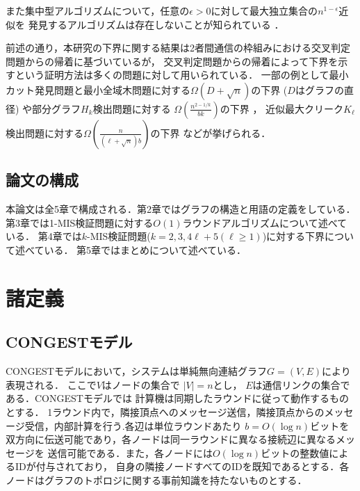 \documentclass[12pt]{thesis}
\newcommand{\CONGEST}{\textsf{CONGEST}}
\theoremstyle{definition}
\begin{document}
また集中型アルゴリズムについて，任意の$\epsilon > 0$に対して最大独立集合の$n^{1 - \epsilon}$近似を
発見するアルゴリズムは存在しないことが知られている \cite{haastad1999clique}．
 
前述の通り，本研究の下界に関する結果は2者間通信の枠組みにおける交叉判定問題からの帰着に基づいているが，
交叉判定問題からの帰着によって下界を示すという証明方法は多くの問題に対して用いられている．
一部の例として最小カット発見問題と最小全域木問題に対する$\Omega (D + \sqrt{n})$の下界
($D$はグラフの直径) \cite{sarma2012distributed}や部分グラフ$H_{k}$検出問題に対する
$\Omega \left(\frac{n^{2 - 1/k}}{bk}\right)$の下界 \cite{fischer2018possibilities}，
近似最大クリーク$K_{\ell}$検出問題に対する$\Omega \left(\frac{n}{(\ell + \sqrt{n})b}\right)$の下界
 \cite{czumaj2020detecting}などが挙げられる．

\section{論文の構成}
本論文は全5章で構成される．第2章ではグラフの構造と用語の定義をしている．
第3章では1-MIS検証問題に対する$O(1)$ラウンドアルゴリズムについて述べている．
第4章では$k$-MIS検証問題($k = 2, 3, 4\ell + 5 (\ell \geq 1)$)に対する下界について述べている．
第5章ではまとめについて述べている．

\chapter{諸定義}

\section{{\CONGEST}モデル}
{\CONGEST}モデルにおいて，システムは単純無向連結グラフ$G =  (V,E)$により表現される．
ここで$V$はノードの集合で $|V| = n$とし， $E$は通信リンクの集合である．{\CONGEST}モデルでは
計算機は同期したラウンドに従って動作するものとする．
1ラウンド内で，隣接頂点へのメッセージ送信，隣接頂点からのメッセージ受信，内部計算を行う.各辺は単位ラウンドあたり
$b = O(\log n)$ビットを双方向に伝送可能であり，各ノードは同一ラウンドに異なる接続辺に異なるメッセージを
送信可能である．また，各ノードには$O(\log n)$ビットの整数値によるIDが付与されており，
自身の隣接ノードすべてのIDを既知であるとする．各ノードはグラフのトポロジに関する事前知識を持たないものとする．
\end{document}

